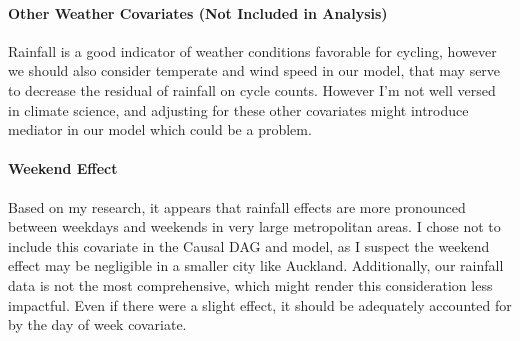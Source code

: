 \documentclass[
]{article}
\begin{document}
\hypertarget{other-weather-covariates-not-included-in-analysis}{%
\paragraph{Other Weather Covariates (Not Included in
Analysis)}\label{other-weather-covariates-not-included-in-analysis}}

Rainfall is a good indicator of weather conditions favorable for
cycling, however we should also consider temperate and wind speed in our
model, that may serve to decrease the residual of rainfall on cycle
counts. However I'm not well versed in climate science, and adjusting
for these other covariates might introduce mediator in our model which
could be a problem.

\hypertarget{weekend-effect}{%
\paragraph{Weekend Effect}\label{weekend-effect}}

Based on my research, it appears that rainfall effects are more
pronounced between weekdays and weekends in very large metropolitan
areas. I chose not to include this covariate in the Causal DAG and
model, as I suspect the weekend effect may be negligible in a smaller
city like Auckland. Additionally, our rainfall data is not the most
comprehensive, which might render this consideration less impactful.
Even if there were a slight effect, it should be adequately accounted
for by the day of week covariate.
\end{document}
